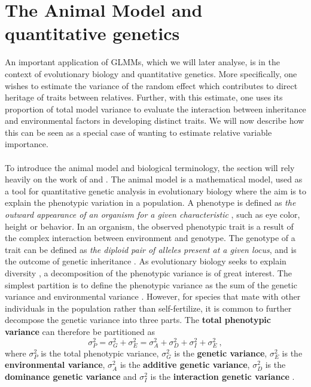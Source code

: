 \section{The Animal Model and quantitative genetics}
\label{sec:animalmodel}
An important application of GLMMs, which we will later analyse, is in the context of evolutionary biology and quantitative genetics. More specifically, one wishes to estimate the variance of the random effect which contributes to direct heritage of traits between relatives. Further, with this estimate, one uses its proportion of total model variance to evaluate the interaction between inheritance and environmental factors in developing distinct traits.
We will now describe how this can be seen as a special case of wanting to estimate relative variable importance.
\\
\\
To introduce the animal model and biological terminology, the section will rely heavily on the work of \citet{Kruuk2004} and \citet{ConnerHartl2004}. 
The animal model is a mathematical model, used as a tool for quantitative genetic analysis in evolutionary biology where the aim is to explain the phenotypic variation in a population.
A phenotype is defined as \textit{the outward appearance of an organism for a given characteristic} \citep{ConnerHartl2004}, such as eye color, height or behavior. 
In an organism, the observed phenotypic trait is a result of the complex interaction between environment and genotype. 
The genotype of a trait can be defined as \textit{the diploid pair of alleles present at a given locus}, and is the outcome of genetic inheritance \citep{ConnerHartl2004}. 
As evolutionary biology seeks to explain diversity \citep{Kruuk2004}, a decomposition of the phenotypic variance is of great interest. 
The simplest partition is to define the phenotypic variance as the sum of the genetic variance and environmental variance \citep{ConnerHartl2004}. 
However, for species that mate with other individuals in the population rather than self-fertilize, it is common to further decompose the genetic variance into three parts. 
The \textbf{total phenotypic variance} can therefore be partitioned as
\begin{equation}
    \sigma^2_P = \sigma^2_G + \sigma^2_E = \sigma^2_A + \sigma^2_D + \sigma^2_I + \sigma^2_E \ ,
\end{equation}
where $\sigma^2_P$ is the total phenotypic variance, $\sigma^2_G$ is the \textbf{genetic variance}, $\sigma^2_E$ is the \textbf{environmental variance}, $\sigma^2_A$ is the \textbf{additive genetic variance}, $\sigma^2_D$ is the \textbf{dominance genetic variance} and $\sigma^2_I$ is the \textbf{interaction genetic variance} \citep{ConnerHartl2004}.
